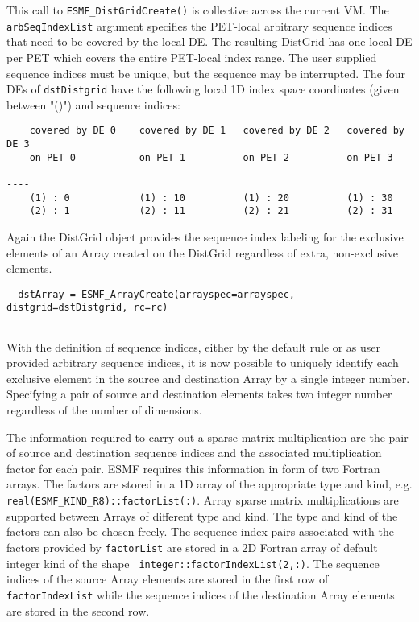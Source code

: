    This call to {\tt ESMF\_DistGridCreate()} is collective across the current VM.
   The {\tt arbSeqIndexList} argument specifies the PET-local arbitrary sequence
   indices that need to be covered by the local DE. The resulting DistGrid has
   one local DE per PET which covers the entire PET-local index range. The user
   supplied sequence indices must be unique, but the sequence may be interrupted.
   The four DEs of {\tt dstDistgrid} have the following local 1D index space
   coordinates (given between "()") and sequence indices:
   \begin{verbatim}
    covered by DE 0    covered by DE 1   covered by DE 2   covered by DE 3
    on PET 0           on PET 1          on PET 2          on PET 3
    ----------------------------------------------------------------------
    (1) : 0            (1) : 10          (1) : 20          (1) : 30
    (2) : 1            (2) : 11          (2) : 21          (2) : 31
   \end{verbatim}
  
   Again the DistGrid object provides the sequence index labeling for the
   exclusive elements of an Array created on the DistGrid regardless of extra,
   non-exclusive elements. 

 \begin{verbatim}
  dstArray = ESMF_ArrayCreate(arrayspec=arrayspec, distgrid=dstDistgrid, rc=rc)
 
\end{verbatim}
 

   With the definition of sequence indices, either by the default rule or as user
   provided arbitrary sequence indices, it is now possible to uniquely identify
   each exclusive element in the source and destination Array by a single integer
   number. Specifying a pair of source and destination elements takes two integer
   number regardless of the number of dimensions.
  
   \begin{sloppypar}
   The information required to carry out a sparse matrix multiplication are the
   pair of source and destination sequence indices and the associated
   multiplication factor for each pair. ESMF requires this information in form of
   two Fortran arrays. The factors are stored in a 1D array of the appropriate
   type and kind, e.g. {\tt real(ESMF\_KIND\_R8)::factorList(:)}. Array sparse
   matrix multiplications are supported between Arrays of different type and
   kind. The type and kind of the factors can also be chosen freely. The 
   sequence index pairs associated with the factors provided by {\tt factorList} 
   are stored in a 2D Fortran array of default integer kind of the shape {\tt
   integer::factorIndexList(2,:)}. The sequence indices of the source Array elements
   are stored in the first row of {\tt 
   factorIndexList} while the sequence indices of the destination Array elements are
   stored in the second row.
   \end{sloppypar}
  
